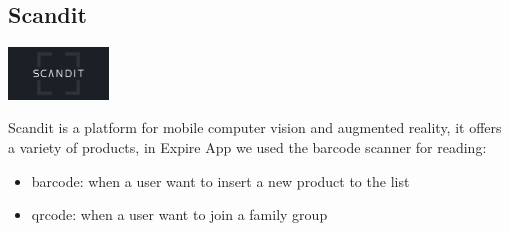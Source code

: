 \subsection{Scandit}


\begin{center}
\includegraphics[width=0.20\textwidth]{Images/external_serv/scandit.png}
\end{center}
Scandit is a platform for mobile computer vision and augmented reality, it offers a variety of products, in Expire App we used the barcode scanner for reading:
\begin{itemize}
    \item barcode: when a user want to insert a new product to the list
    \item qrcode: when a user want to join a family group
\end{itemize}
\newpage